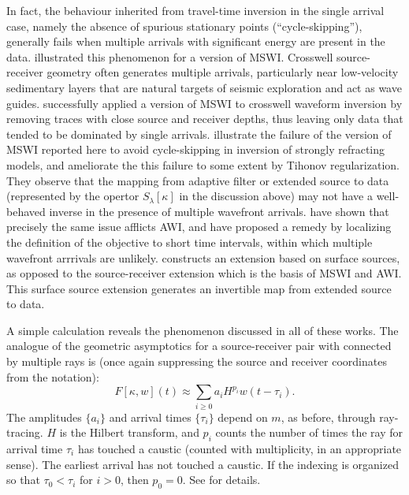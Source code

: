 In fact, the behaviour inherited from travel-time inversion in the
single arrival case, namely the absence of spurious stationary points
(``cycle-skipping''), generally fails when multiple arrivals with
significant energy are present in the data. \cite{Symes:94c}
illustrated this phenomenon for a version of MSWI. Crosswell
source-receiver geometry often generates multiple arrivals,
particularly near low-velocity sedimentary layers that are natural
targets of seismic exploration and act as wave
guides. \cite{Plessix:00} successfully applied a version of MSWI to
crosswell waveform inversion by removing traces with close source and
receiver depths, thus leaving only data that tended to be dominated by
single arrivals. \cite{HuangSymes:Geo17} illustrate the failure of the
version of MSWI reported here to avoid cycle-skipping in inversion of
strongly refracting models, and ameliorate the this failure to some
extent by Tihonov regularization. They observe that the mapping from
adaptive filter or extended source to data (represented by the opertor
$S_{\lambda}[\kappa]$ in the discussion above) may not have a well-behaved inverse in
the presence of multiple wavefront arrivals. \cite{Yongetal:GJI23}
have shown that precisely the same issue afflicts AWI, and have
proposed a remedy by localizing the definition of the objective to
short time intervals, within which multiple wavefront arrrivals are
unlikely. \cite{Symes:23} constructs an extension based on surface
sources, as opposed to the source-receiver extension which is the
basis of MSWI and AWI. This surface source extension generates an
invertible map from extended source to data.

A simple calculation reveals the phenomenon discussed in all of these
works. The analogue of the geometric asymptotics for a source-receiver
pair with connected by multiple rays is (once again suppressing the
source and receiver coordinates from the notation):
\begin{equation}
  \label{eqn:multi}
  F[\kappa,w](t) \approx \sum_{i \ge 0} a_i H^{p_i}w(t-\tau_i).
\end{equation}
The amplitudes $\{a_i\}$ and arrival times $\{\tau_i\}$ depend on $m$, as
before, through ray-tracing. $H$ is the Hilbert transform, and $p_i$
counts the number of times the ray for arrival time $\tau_i$ has
touched a caustic (counted with multiplicity, in an appropriate
sense). The earliest arrival has not touched a caustic. If the
indexing is organized so that $\tau_0 < \tau_i$ for $i>0$, then
$p_0=0$. See \cite{Friedlander:75} for details.

